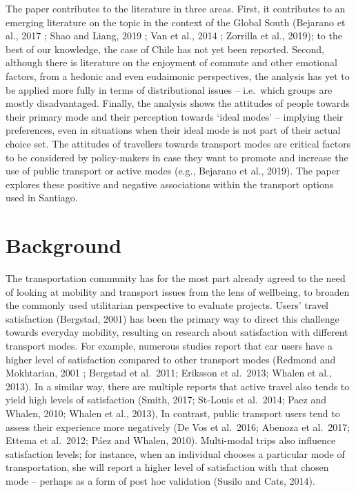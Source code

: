 \documentclass[]{elsarticle} %
\begin{document}
The paper contributes to the literature in three areas. First, it
contributes to an emerging literature on the topic in the context of the
Global South (Bejarano et al., 2017 ; Shao and Liang, 2019 ; Van et al.,
2014 ; Zorrilla et al., 2019); to the best of our knowledge, the case of
Chile has not yet been reported. Second, although there is literature on
the enjoyment of commute and other emotional factors, from a hedonic and
even eudaimonic perspectives, the analysis has yet to be applied more
fully in terms of distributional issues -- i.e.~which groups are mostly
disadvantaged. Finally, the analysis shows the attitudes of people
towards their primary mode and their perception towards `ideal modes' --
implying their preferences, even in situations when their ideal mode is
not part of their actual choice set. The attitudes of travellers towards
transport modes are critical factors to be considered by policy-makers
in case they want to promote and increase the use of public transport or
active modes (e.g., Bejarano et al., 2019). The paper explores these
positive and negative associations within the transport options used in
Santiago.

\hypertarget{background}{%
\section{Background}\label{background}}

The transportation community has for the most part already agreed to the
need of looking at mobility and transport issues from the lens of
wellbeing, to broaden the commonly used utilitarian perspective to
evaluate projects. Users' travel satisfaction (Bergstad, 2001) has been
the primary way to direct this challenge towards everyday mobility,
resulting on research about satisfaction with different transport modes.
For example, numerous studies report that car users have a higher level
of satisfaction compared to other transport modes (Redmond and
Mokhtarian, 2001 ; Bergstad et al.~2011; Eriksson et al.~2013; Whalen et
al., 2013). In a similar way, there are multiple reports that active
travel also tends to yield high levels of satisfaction (Smith, 2017;
St-Louis et al.~2014; Paez and Whalen, 2010; Whalen et al., 2013), In
contrast, public transport users tend to assess their experience more
negatively (De Vos et al.~2016; Abenoza et al.~2017; Ettema et al.~2012;
Páez and Whalen, 2010). Multi-modal trips also influence satisfaction
levels; for instance, when an individual chooses a particular mode of
transportation, she will report a higher level of satisfaction with that
chosen mode -- perhaps as a form of post hoc validation (Susilo and
Cats, 2014).
\end{document}
